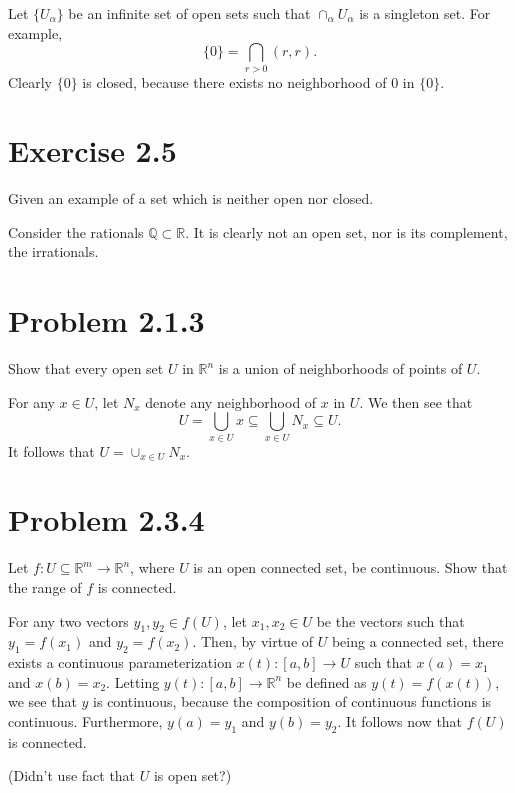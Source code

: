 \documentclass[12pt]{article}
\newcommand{\R}{\mathbb{R}}
\newcommand{\Q}{\mathbb{Q}}
\begin{document}
Let $\{U_\alpha\}$ be an infinite set of open sets such that $\cap_\alpha U_\alpha$
is a singleton set.  For example,
\begin{equation*}
\{0\} = \bigcap_{r>0}(r,r).
\end{equation*}
Clearly $\{0\}$ is closed, because there exists no neighborhood of 0 in $\{0\}$.

\section*{Exercise 2.5}

Given an example of a set which is neither open nor closed.

Consider the rationals $\Q\subset\R$.  It is clearly not an open set, nor is its complement, the irrationals.

\section*{Problem 2.1.3}

Show that every open set $U$ in $\R^n$ is a union of neighborhoods of points of $U$.

For any $x\in U$, let $N_x$ denote any neighborhood of $x$ in $U$.  We then see that
\begin{equation}
U = \bigcup_{x\in U} x\subseteq \bigcup_{x\in U} N_x \subseteq U.
\end{equation}
It follows that $U=\cup_{x\in U}N_x$.

\pagebreak
\section*{Problem 2.3.4}

Let $f:U\subseteq \R^m\to\R^n$, where $U$ is an open connected
set, be continuous.  Show that the range of $f$ is connected.

For any two vectors $y_1,y_2\in f(U)$, let $x_1,x_2\in U$ be the vectors
such that $y_1=f(x_1)$ and $y_2=f(x_2)$.  Then, by virtue of $U$ being
a connected set, there exists a continuous parameterization $x(t):[a,b]\to U$
such that $x(a)=x_1$ and $x(b)=x_2$.  Letting $y(t):[a,b]\to\R^n$ be
defined as $y(t)=f(x(t))$, we see that $y$ is continuous, because the composition
of continuous functions is continuous.  Furthermore, $y(a)=y_1$ and $y(b)=y_2$.
It follows now that $f(U)$ is connected.

(Didn't use fact that $U$ is open set?)
\end{document}
